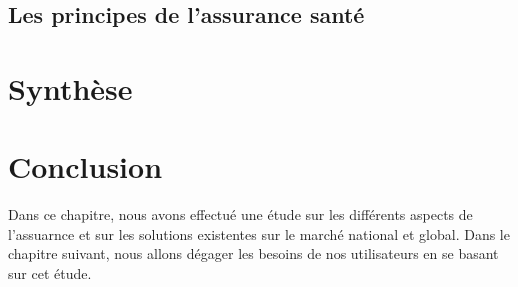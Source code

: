    \subsection{Les principes de l’assurance santé}
    \begin{figure}[H]
                \centering
                \end{figure}

   \section{Synthèse}
   \begin{figure}[H]
                \centering
                \end{figure}
          
    


\section*{Conclusion}
Dans ce chapitre, nous avons effectué une étude sur les différents aspects de l'assuarnce et sur les solutions existentes sur le marché national et global. Dans le chapitre suivant, nous allons dégager les besoins de nos utilisateurs en se basant sur cet étude. 